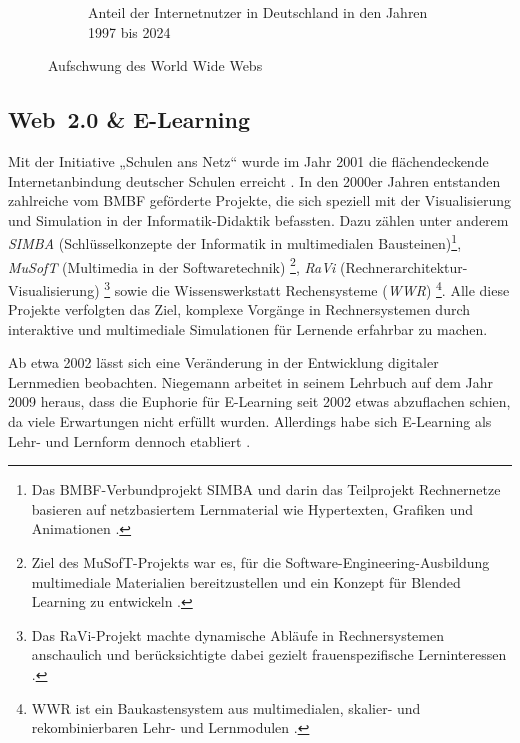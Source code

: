 \begin{figure}[h!]
\begin{subfigure}[b]{0.48\textwidth}
        \caption{Anteil der Internetnutzer in Deutschland in den Jahren 1997 bis 2024 \cite{statista_anteil_2024}}
        \label{fig:internetnutzer}
		\end{subfigure}
    \caption{Aufschwung des World Wide Webs}
    \label{fig:www}
\end{figure}

\subsection{Web~2.0 \& E-Learning}

Mit der Initiative „Schulen ans Netz“ \cite{schulen_ans_netz_ev_schulen_nodate} wurde im Jahr 2001 die flächendeckende Internetanbindung deutscher Schulen erreicht \cite{kopcke_internet_2016}. In den 2000er Jahren entstanden zahlreiche vom \ac{BMBF} geförderte Projekte, die sich speziell mit der Visualisierung und Simulation in der Informatik-Didaktik befassten. Dazu zählen unter anderem \textit{SIMBA} (Schlüsselkonzepte der Informatik in multimedialen Bausteinen)\footnote{Das \ac{BMBF}-Verbundprojekt SIMBA und darin das Teilprojekt Rechnernetze basieren auf netzbasiertem Lernmaterial wie Hypertexten, Grafiken und Animationen \parencite[S.~75]{magenheim_blended_2003}.}, \textit{MuSofT} (Multimedia in der Softwaretechnik) \footnote{Ziel des MuSofT-Projekts war es, für die Software-Engineering-Ausbildung multimediale Materialien bereitzustellen und ein Konzept für Blended Learning zu entwickeln \parencite[S.~73]{magenheim_blended_2003}.}, \textit{RaVi} (Rechnerarchitektur-Visualisierung) \footnote{Das RaVi-Projekt machte dynamische Abläufe in Rechnersystemen anschaulich und berücksichtigte dabei gezielt frauenspezifische Lerninteressen \parencite[S.~20]{marwedel_interaktive_2003}.} sowie die Wissenswerkstatt Rechensysteme (\textit{WWR}) \footnote{WWR ist ein Baukastensystem aus multimedialen, skalier- und rekombinierbaren Lehr- und Lernmodulen \parencite[S.~1]{kornelsen_inhalte_2004}.}. Alle diese Projekte verfolgten das Ziel, komplexe Vorgänge in Rechnersystemen durch interaktive und multimediale Simulationen für Lernende erfahrbar zu machen.

Ab etwa 2002 lässt sich eine Veränderung in der Entwicklung digitaler Lernmedien beobachten. Niegemann arbeitet in seinem Lehrbuch auf dem Jahr 2009 heraus, dass die Euphorie für E-Learning seit 2002 etwas abzuflachen schien, da viele Erwartungen nicht erfüllt wurden. Allerdings habe sich E-Learning als Lehr- und Lernform dennoch etabliert \parencite[S.~14]{niegemann_kompendium_2008}.

